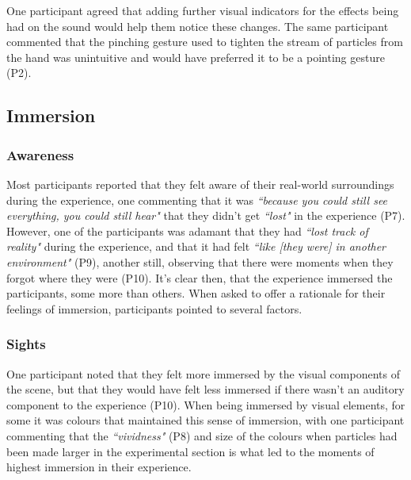 One participant agreed that adding further visual indicators for the effects being had on the sound would help them notice these changes. The same participant commented that the pinching gesture used to tighten the stream of particles from the hand was unintuitive and would have preferred it to be a pointing gesture (P2).

\subsection{Immersion}\label{sec: polaris-feedback-immersion}
\subsubsection{Awareness}\label{sec: polaris-feedback-immersion-awareness}
Most participants reported that they felt aware of their real-world surroundings during the experience, one commenting that it was \textit{``because you could still see everything, you could still hear"} that they didn’t get \textit{``lost"} in the experience (P7). However, one of the participants was adamant that they had \textit{``lost track of reality"} during the experience, and that it had felt \textit{``like [they were] in another environment"} (P9), another still, observing that there were moments when they forgot where they were (P10). It’s clear then, that the experience immersed the participants, some more than others. When asked to offer a rationale for their feelings of immersion, participants pointed to several factors.

\subsubsection{Sights}\label{sec: polaris-feedback-immersion-sights}
One participant noted that they felt more immersed by the visual components of the scene, but that they would have felt less immersed if there wasn’t an auditory component to the experience (P10). When being immersed by visual elements, for some it was colours that maintained this sense of immersion, with one participant commenting that the \textit{``vividness"} (P8) and size of the colours when particles had been made larger in the experimental section is what led to the moments of highest immersion in their experience.

